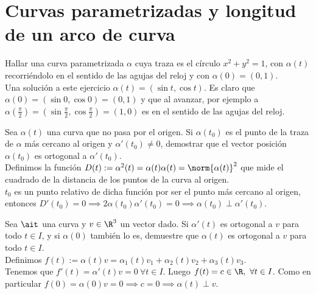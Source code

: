\chapter{Curvas parametrizadas y longitud de un arco de curva}

\begin{ejercicio} Hallar una curva parametrizada $\alpha$ cuya traza es el círculo $x^2+y^2=1$, con $\alpha(t)$ recorriéndolo en el sentido de las agujas del reloj y con $\alpha(0) =(0,1)$.\\

Una solución a este ejercicio $\alpha(t)=(\sin t, \cos t)$. Es claro que $\alpha(0) =(\sin 0,\cos 0) =(0,1)$ y que al avanzar, por ejemplo a $\alpha(\frac{\pi}{2})=(\sin \frac{\pi}{2},\cos \frac{\pi}{2}) = (1,0)$ es en el sentido de las agujas del reloj.
\end{ejercicio}

\begin{ejercicio} Sea $\alpha(t)$  una curva que no pasa por el origen. Si $\alpha(t_0)$ es el punto de la traza de $\alpha$ más cercano al origen y $\alpha'(t_0)\neq 0$, demostrar que el vector posición $\alpha(t_0)$ es ortogonal a $\alpha'(t_0)$.\\

Definimos la función $D(t):=\alpha^2(t)=\alpha(t)\alpha(t)=\norm{\alpha(t)}^2$ que mide el cuadrado de la distancia de los puntos de la curva al origen.\\
$t_0$ es un punto relativo de dicha función por ser el punto más cercano al origen, entonces $D'(t_0)=0\implies 2\alpha(t_0)\alpha'(t_0)=0\implies\alpha(t_0)\perp\alpha'(t_0)$.
\end{ejercicio}

\begin{ejercicio} Sea $\ait$ una curva y $v\in\R^3$ un vector dado. Si $\alpha'(t)$ es ortogonal a $v$ para todo $t\in I$, y si $\alpha(0)$ también lo es, demuestre que $\alpha(t)$ es ortogonal a $v$ para todo $t\in I$.\\

Definimos $f(t):= \alpha(t)v= \alpha_1(t)v_1 + \alpha_2(t)v_2 +\alpha_3(t)v_3$.\\
Tenemos que $f'(t) = \alpha'(t)v= 0\ \forall t\in I$. Luego $f(t)= c\in \R,\ \forall t\in I$. Como en particular $f(0)=\alpha(0)v=0\implies c=0\implies \alpha(t)\perp v$.
\end{ejercicio}

